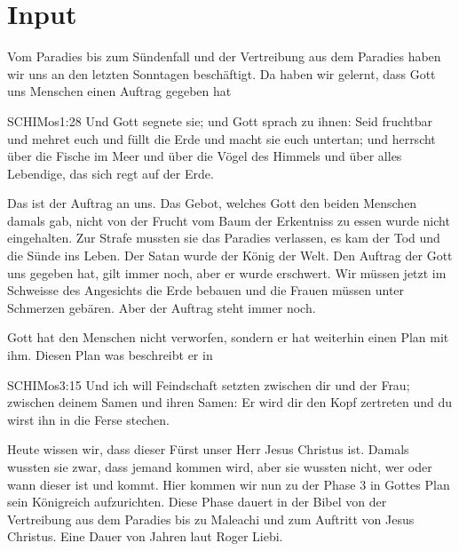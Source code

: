 \documentclass{../../inc/mybib}
\begin{document}
\section{ Input }
\begin{spacing}{1.5}
    \begin{block}[Paradies]
        Vom Paradies bis zum Sündenfall und der Vertreibung aus dem Paradies haben wir uns an den letzten Sonntagen beschäftigt. Da haben wir gelernt, dass Gott uns Menschen einen Auftrag gegeben hat
        \begin{bibelbox}{SCH}{IMos}{1:28}
            Und Gott segnete sie; und Gott sprach zu ihnen: Seid fruchtbar und mehret euch und füllt die Erde und macht sie euch untertan; und herrscht über die Fische im Meer und über die Vögel des Himmels und über alles Lebendige, das sich regt auf der Erde.
        \end{bibelbox}
        Das ist der Auftrag an uns. Das Gebot, welches Gott den beiden Menschen damals gab, nicht von der Frucht vom Baum der Erkentniss zu essen wurde nicht eingehalten. Zur Strafe mussten sie das Paradies verlassen, es kam der Tod und die Sünde ins Leben. Der Satan wurde der König der Welt. Den Auftrag der Gott uns gegeben hat, gilt immer noch, aber er wurde erschwert. Wir müssen jetzt im Schweisse des Angesichts die Erde bebauen und die Frauen müssen unter Schmerzen gebären. Aber der Auftrag steht immer noch.

        Gott hat den Menschen nicht verworfen, sondern er hat weiterhin einen Plan mit ihm. Diesen Plan was beschreibt er in 
        \begin{bibelbox}{SCH}{IMos}{3:15}
            Und ich will Feindschaft setzten zwischen dir und der Frau; zwischen deinem Samen und ihren Samen: Er wird dir den Kopf zertreten und du wirst ihn in die Ferse stechen.
        \end{bibelbox}
        Heute wissen wir, dass dieser Fürst unser Herr Jesus Christus ist. Damals wussten sie zwar, dass jemand kommen wird, aber sie wussten nicht, wer oder wann dieser ist und kommt.
        Hier kommen wir nun zu der Phase 3 in Gottes Plan sein Königreich aufzurichten. Diese Phase dauert in der Bibel von der Vertreibung aus dem Paradies bis zu Maleachi und zum Auftritt von Jesus Christus. Eine Dauer von  Jahren laut Roger Liebi.


\end{block}
\end{spacing}
\end{document}
